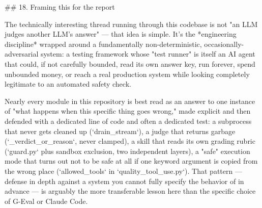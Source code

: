 ## 18. Framing this for the report

The technically interesting thread running through this codebase is not "an LLM judges another LLM's answer" — that idea is simple. It's the *engineering discipline* wrapped around a fundamentally non-deterministic, occasionally-adversarial system: a testing framework whose "test runner" is itself an AI agent that could, if not carefully bounded, read its own answer key, run forever, spend unbounded money, or reach a real production system while looking completely legitimate to an automated safety check.

Nearly every module in this repository is best read as an answer to one instance of "what happens when this specific thing goes wrong," made explicit and then defended with a dedicated line of code and often a dedicated test: a subprocess that never gets cleaned up (`drain_stream`), a judge that returns garbage (`_verdict_or_reason`, never clamped), a skill that reads its own grading rubric (`guard.py` plus sandbox exclusion, two independent layers), a "safe" execution mode that turns out not to be safe at all if one keyword argument is copied from the wrong place (`allowed_tools` in `quality_tool_use.py`). That pattern — defense in depth against a system you cannot fully specify the behavior of in advance — is arguably the more transferable lesson here than the specific choice of G-Eval or Claude Code.
